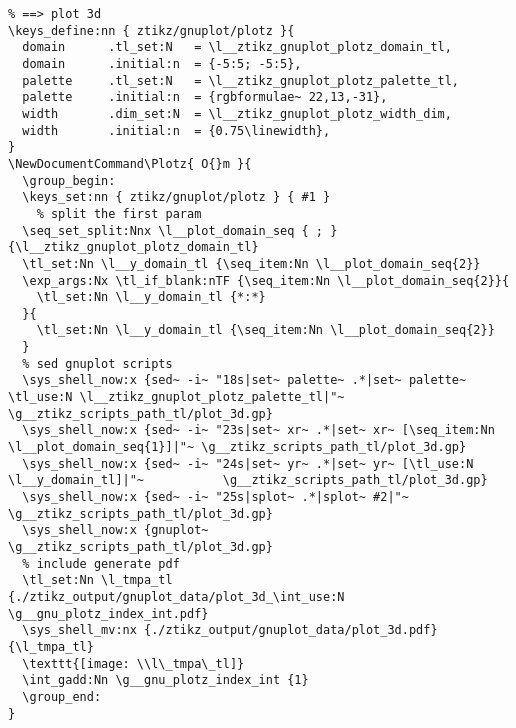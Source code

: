 \begin{verbatim}
% ==> plot 3d
\keys_define:nn { ztikz/gnuplot/plotz }{
  domain      .tl_set:N   = \l__ztikz_gnuplot_plotz_domain_tl,
  domain      .initial:n  = {-5:5; -5:5},
  palette     .tl_set:N   = \l__ztikz_gnuplot_plotz_palette_tl,
  palette     .initial:n  = {rgbformulae~ 22,13,-31},
  width       .dim_set:N  = \l__ztikz_gnuplot_plotz_width_dim,
  width       .initial:n  = {0.75\linewidth},
}
\NewDocumentCommand\Plotz{ O{}m }{
  \group_begin:
  \keys_set:nn { ztikz/gnuplot/plotz } { #1 }
	% split the first param
  \seq_set_split:Nnx \l__plot_domain_seq { ; }{\l__ztikz_gnuplot_plotz_domain_tl}
  \tl_set:Nn \l__y_domain_tl {\seq_item:Nn \l__plot_domain_seq{2}}
  \exp_args:Nx \tl_if_blank:nTF {\seq_item:Nn \l__plot_domain_seq{2}}{
    \tl_set:Nn \l__y_domain_tl {*:*}
  }{
    \tl_set:Nn \l__y_domain_tl {\seq_item:Nn \l__plot_domain_seq{2}}
  }
  % sed gnuplot scripts
  \sys_shell_now:x {sed~ -i~ "18s|set~ palette~ .*|set~ palette~ \tl_use:N \l__ztikz_gnuplot_plotz_palette_tl|"~  \g__ztikz_scripts_path_tl/plot_3d.gp}
  \sys_shell_now:x {sed~ -i~ "23s|set~ xr~ .*|set~ xr~ [\seq_item:Nn \l__plot_domain_seq{1}]|"~ \g__ztikz_scripts_path_tl/plot_3d.gp}
  \sys_shell_now:x {sed~ -i~ "24s|set~ yr~ .*|set~ yr~ [\tl_use:N \l__y_domain_tl]|"~           \g__ztikz_scripts_path_tl/plot_3d.gp}
  \sys_shell_now:x {sed~ -i~ "25s|splot~ .*|splot~ #2|"~                                        \g__ztikz_scripts_path_tl/plot_3d.gp}
  \sys_shell_now:x {gnuplot~                                                                    \g__ztikz_scripts_path_tl/plot_3d.gp}
  % include generate pdf
  \tl_set:Nn \l_tmpa_tl {./ztikz_output/gnuplot_data/plot_3d_\int_use:N \g__gnu_plotz_index_int.pdf}
  \sys_shell_mv:nx {./ztikz_output/gnuplot_data/plot_3d.pdf}{\l_tmpa_tl}
  \texttt{[image: \\l\_tmpa\_tl]}
  \int_gadd:Nn \g__gnu_plotz_index_int {1}
  \group_end:
}
\end{verbatim}

